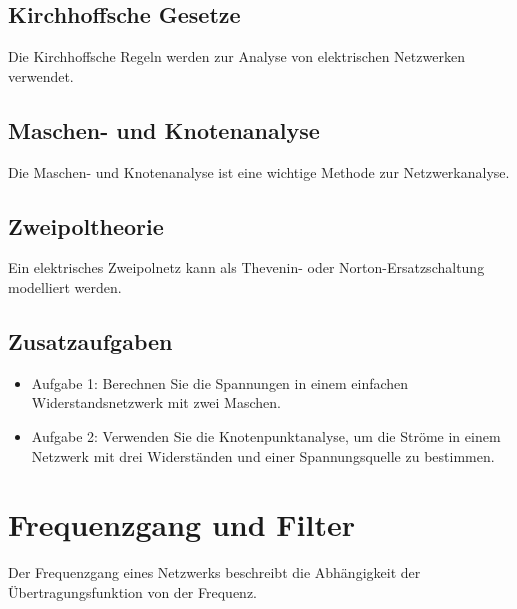 \documentclass[11pt,a4paper]{article}
\begin{document}
\subsection{Kirchhoffsche Gesetze}
Die Kirchhoffsche Regeln werden zur Analyse von elektrischen Netzwerken verwendet.





\subsection{Maschen- und Knotenanalyse}
Die Maschen- und Knotenanalyse ist eine wichtige Methode zur Netzwerkanalyse.





\subsection{Zweipoltheorie}
Ein elektrisches Zweipolnetz kann als Thevenin- oder Norton-Ersatzschaltung modelliert werden.



\subsection{Zusatzaufgaben}
\begin{itemize}
	\item Aufgabe 1: Berechnen Sie die Spannungen in einem einfachen Widerstandsnetzwerk mit zwei Maschen.
	\item Aufgabe 2: Verwenden Sie die Knotenpunktanalyse, um die Ströme in einem Netzwerk mit drei Widerständen und einer Spannungsquelle zu bestimmen.
\end{itemize}


\vspace{1cm}
\section{Frequenzgang und Filter}
Der Frequenzgang eines Netzwerks beschreibt die Abhängigkeit der Übertragungsfunktion von der Frequenz.
\end{document}
